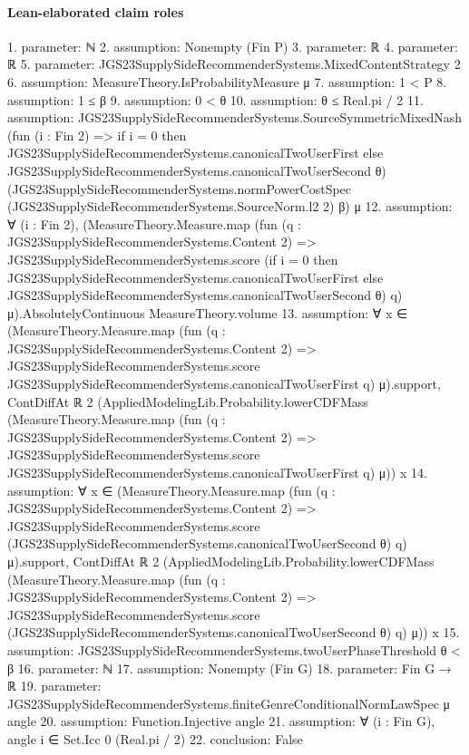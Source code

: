 \documentclass[10pt]{article}
\begin{document}
\paragraph{Lean-elaborated claim roles}\begin{ReviewVerbatim}
1. parameter: ℕ
2. assumption: Nonempty (Fin P)
3. parameter: ℝ
4. parameter: ℝ
5. parameter: JGS23SupplySideRecommenderSystems.MixedContentStrategy 2
6. assumption: MeasureTheory.IsProbabilityMeasure μ
7. assumption: 1 < P
8. assumption: 1 ≤ β
9. assumption: 0 < θ
10. assumption: θ ≤ Real.pi / 2
11. assumption: JGS23SupplySideRecommenderSystems.SourceSymmetricMixedNash
  (fun (i : Fin 2) =>
    if i = 0 then JGS23SupplySideRecommenderSystems.canonicalTwoUserFirst
    else JGS23SupplySideRecommenderSystems.canonicalTwoUserSecond θ)
  (JGS23SupplySideRecommenderSystems.normPowerCostSpec (JGS23SupplySideRecommenderSystems.SourceNorm.l2 2) β) μ
12. assumption: ∀ (i : Fin 2),
  (MeasureTheory.Measure.map
        (fun (q : JGS23SupplySideRecommenderSystems.Content 2) =>
          JGS23SupplySideRecommenderSystems.score
            (if i = 0 then JGS23SupplySideRecommenderSystems.canonicalTwoUserFirst
            else JGS23SupplySideRecommenderSystems.canonicalTwoUserSecond θ)
            q)
        μ).AbsolutelyContinuous
    MeasureTheory.volume
13. assumption: ∀
  x ∈
    (MeasureTheory.Measure.map
        (fun (q : JGS23SupplySideRecommenderSystems.Content 2) =>
          JGS23SupplySideRecommenderSystems.score JGS23SupplySideRecommenderSystems.canonicalTwoUserFirst q)
        μ).support,
  ContDiffAt ℝ 2
    (AppliedModelingLib.Probability.lowerCDFMass
      (MeasureTheory.Measure.map
        (fun (q : JGS23SupplySideRecommenderSystems.Content 2) =>
          JGS23SupplySideRecommenderSystems.score JGS23SupplySideRecommenderSystems.canonicalTwoUserFirst q)
        μ))
    x
14. assumption: ∀
  x ∈
    (MeasureTheory.Measure.map
        (fun (q : JGS23SupplySideRecommenderSystems.Content 2) =>
          JGS23SupplySideRecommenderSystems.score (JGS23SupplySideRecommenderSystems.canonicalTwoUserSecond θ) q)
        μ).support,
  ContDiffAt ℝ 2
    (AppliedModelingLib.Probability.lowerCDFMass
      (MeasureTheory.Measure.map
        (fun (q : JGS23SupplySideRecommenderSystems.Content 2) =>
          JGS23SupplySideRecommenderSystems.score (JGS23SupplySideRecommenderSystems.canonicalTwoUserSecond θ) q)
        μ))
    x
15. assumption: JGS23SupplySideRecommenderSystems.twoUserPhaseThreshold θ < β
16. parameter: ℕ
17. assumption: Nonempty (Fin G)
18. parameter: Fin G → ℝ
19. parameter: JGS23SupplySideRecommenderSystems.finiteGenreConditionalNormLawSpec μ angle
20. assumption: Function.Injective angle
21. assumption: ∀ (i : Fin G), angle i ∈ Set.Icc 0 (Real.pi / 2)
22. conclusion: False
\end{ReviewVerbatim}
\end{document}
